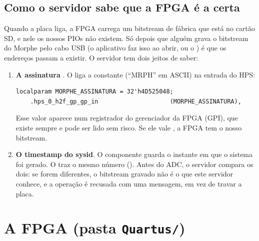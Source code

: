 \documentclass[11pt,a4paper,oneside]{article}
\begin{document}
\subsection{Como o servidor sabe que a FPGA é a certa}\label{sec:assinatura}

Quando a placa liga, a FPGA carrega um bitstream de fábrica que está no cartão
SD, e nele os nossos PIOs não existem. Só depois que alguém grava o bitstream
do Morphe pelo cabo USB (o aplicativo faz isso ao abrir, ou o
) é que os endereços passam a existir. O servidor tem dois
jeitos de saber:

\begin{enumerate}
  \item \textbf{A assinatura} . O  liga a constante
     (``MRPH'' em ASCII) na entrada  do HPS:
\begin{lstlisting}
localparam MORPHE_ASSINATURA = 32'h4D525048;
    .hps_0_h2f_gp_gp_in                    (MORPHE_ASSINATURA),
\end{lstlisting}
    Esse valor aparece num registrador do gerenciador da FPGA (GPI), que existe
    sempre e pode ser lido sem risco. Se ele vale , a FPGA tem o
    nosso bitstream.
  \item \textbf{O timestamp do sysid}. O componente  guarda o
    instante em que o sistema foi gerado. O  traz o mesmo número
    (). Antes do ADC, o servidor compara os dois: se
    forem diferentes, o bitstream gravado não é o que este servidor conhece, e
    a operação é recusada com uma mensagem, em vez de travar a placa.
\end{enumerate}

\section{A FPGA (pasta \texttt{Quartus/})}
\end{document}

